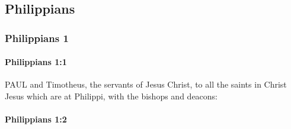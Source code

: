 \subsection{Philippians}
	\label{PHILIPPIANS}
	
	\subsubsection{Philippians 1} %
		\label{PHILIPPIANS-1}
		
		\paragraph{Philippians 1:1} %
			\label{PHILIPPIANS-1-1}

			PAUL and Timotheus, the servants of Jesus Christ, to all the saints in Christ Jesus which are at Philippi, with the bishops and deacons:

			\begin{framed}
			\scriptsize
				\begin{compactdesc}
					\item[SBLG] 
				\end{compactdesc}
			\end{framed}

		\paragraph{Philippians 1:2} %
			\label{PHILIPPIANS-1-2}

